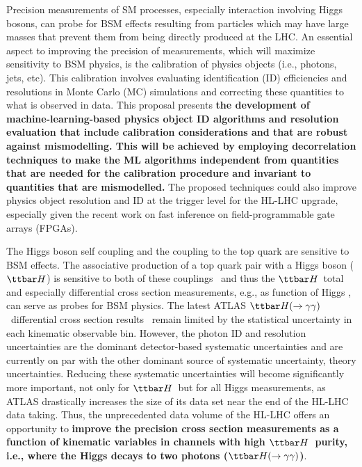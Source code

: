 \documentclass[letter, USenglish, 11pt, subfigure]{article}
\newcommand{\tth}{\ensuremath{\ttbar H}}
\newcommand{\tthyy}{\ensuremath{\ttbar H(\to\gamma\gamma)}}
\begin{document}
Precision measurements of SM processes, especially interaction involving Higgs bosons, can probe for BSM effects resulting from particles which may have large masses that prevent them from being directly produced at the LHC. An essential aspect to improving the precision of measurements, which will maximize sensitivity to BSM physics, is the calibration of physics objects (i.e., photons, jets, etc). This calibration involves evaluating identification (ID) efficiencies and resolutions in Monte Carlo (MC) simulations and correcting these quantities to what is observed in data. This proposal presents {\bf the development of machine-learning-based physics object ID algorithms and resolution evaluation that include calibration considerations and that are robust against mismodelling. This will be achieved by employing decorrelation techniques to make the ML algorithms independent from quantities that are needed for the calibration procedure and invariant to quantities that are mismodelled.} The proposed techniques could also improve physics object resolution and ID at the trigger level for the HL-LHC upgrade, especially given the recent work on fast inference on field-programmable gate arrays (FPGAs).

The Higgs boson self coupling and the coupling to the top quark are sensitive to BSM effects. The associative production of a top quark pair with a Higgs boson (\tth) is sensitive to both of these couplings~\cite{Maltoni_2017} and thus the \tth\ total and especially differential cross section measurements, e.g., as function of Higgs \pt, can serve as probes for BSM physics. The latest ATLAS \tthyy\ differential cross section results~\cite{ATLAS_STXS} remain limited by the statistical uncertainty in each kinematic observable bin. However, the photon ID and resolution uncertainties are the dominant detector-based systematic uncertainties and are currently on par with the other dominant source of systematic uncertainty, theory uncertainties. Reducing these systematic uncertainties will become significantly more important, not only for \tth\ but for all Higgs measurements, as ATLAS drastically increases the size of its data set near the end of the HL-LHC data taking. Thus, the unprecedented data volume of the HL-LHC offers an opportunity to {\bf improve the precision cross section measurements as a function of kinematic variables in channels with high \tth\ purity, i.e., where the Higgs decays to two photons (\tthyy)}. 
\end{document}
